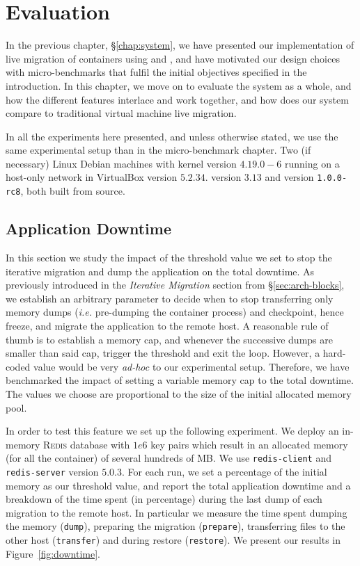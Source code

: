 \chapter{Evaluation} \label{chap:evaluation}

In the previous chapter, \S\ref{chap:system}, we have presented our implementation of live migration of containers using \criu and \runc, and have motivated our design choices with micro-benchmarks that fulfil the initial objectives specified in the introduction.
In this chapter, we move on to evaluate the system as a whole, and how the different features interlace and work together, and  how does our system compare to traditional virtual machine live migration.

In all the experiments here presented, and unless otherwise stated, we use the same experimental setup than in the micro-benchmark chapter.
Two (if necessary) Linux Debian machines with kernel version $4.19.0-6$ running on a host-only network in VirtualBox version $5.2.34$.
\criu version $3.13$ and \runc version \texttt{1.0.0-rc8}, both built from source.

\section{Application Downtime}

In this section we study the impact of the threshold value we set to stop the iterative migration and dump the application on the total downtime.
As previously introduced in the \textit{Iterative Migration} section from \S\ref{sec:arch-blocks}, we establish an arbitrary parameter to decide when to stop transferring only memory dumps (\textit{i.e.} pre-dumping the container process) and checkpoint, hence freeze, and migrate the application to the remote host.
A reasonable rule of thumb is to establish a memory cap, and whenever the successive dumps are smaller than said cap, trigger the threshold and exit the loop.
However, a hard-coded value would be very \textit{ad-hoc} to our experimental setup.
Therefore, we have benchmarked the impact of setting a variable memory cap to the total downtime.
The values we choose are proportional to the size of the initial allocated memory pool.

In order to test this feature we set up the following experiment.
We deploy an in-memory \textsc{Redis} database with $1e6$ key pairs which result in an allocated memory (for all the container) of several hundreds of MB.
We use \texttt{redis-client} and \texttt{redis-server} version $5.0.3$.
For each run, we set a percentage of the initial memory as our threshold value, and report the total application downtime and a breakdown of the time spent (in percentage) during the last dump of each migration to the remote host.
In particular we measure the time spent dumping the memory (\texttt{dump}), preparing the migration (\texttt{prepare}), transferring files to the other host (\texttt{transfer}) and during restore (\texttt{restore}).
We present our results in Figure~\ref{fig:downtime}.

